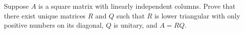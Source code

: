 \begin{exc}
\begin{exercise}
Suppose $A$ is a square matrix with linearly independent columns. Prove that
there exist unique matrices $R$ and $Q$ such that $R$ is lower triangular with
only positive numbers on its diagonal, $Q$ is unitary, and $A=RQ$.
\end{exercise}
\end{exc}
